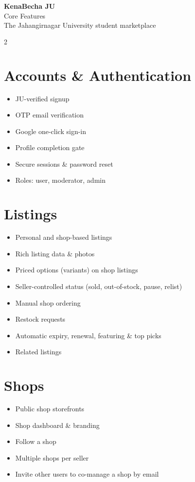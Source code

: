 \documentclass[11pt]{article}
\begin{document}
\begin{center}
  {\LARGE\bfseries\color{brandgreen} KenaBecha JU}\\[0.15cm]
  {\large\color{darktext} Core Features}\\[0.1cm]
  {\small\color{graytext} The Jahangirnagar University student marketplace}
\end{center}
\vspace{0.4cm}

\begin{multicols}{2}
\small

\section{Accounts \& Authentication}
\begin{itemize}
  \item JU-verified signup
  \item OTP email verification
  \item Google one-click sign-in
  \item Profile completion gate
  \item Secure sessions \& password reset
  \item Roles: user, moderator, admin
\end{itemize}

\section{Listings}
\begin{itemize}
  \item Personal and shop-based listings
  \item Rich listing data \& photos
  \item Priced options (variants) on shop listings
  \item Seller-controlled status (sold, out-of-stock, pause, relist)
  \item Manual shop ordering
  \item Restock requests
  \item Automatic expiry, renewal, featuring \& top picks
  \item Related listings
\end{itemize}

\section{Shops}
\begin{itemize}
  \item Public shop storefronts
  \item Shop dashboard \& branding
  \item Follow a shop
  \item Multiple shops per seller
  \item Invite other users to co-manage a shop by email
\end{itemize}


\end{multicols}
\end{document}
